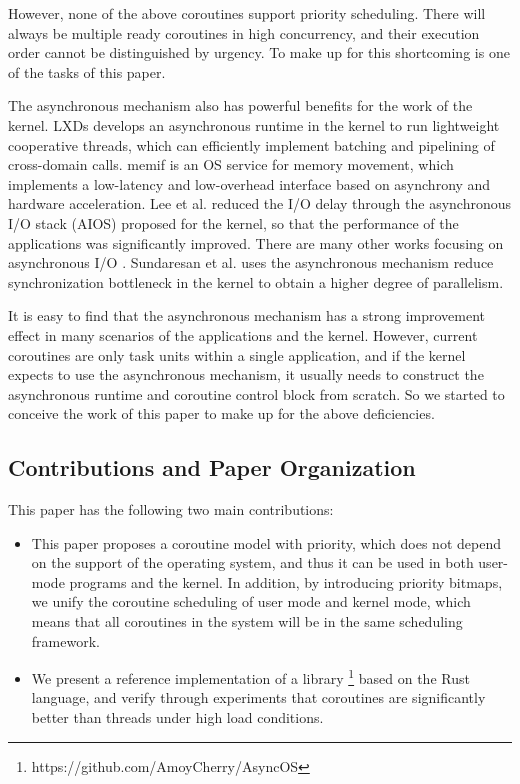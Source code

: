 \documentclass[conference]{IEEEtran}
\begin{document}
However, none of the above coroutines support priority scheduling. There will always be multiple ready coroutines in high concurrency, and their execution order cannot be distinguished by urgency. To make up for this shortcoming is one of the tasks of this paper.

The asynchronous mechanism also has powerful benefits for the work of the kernel. LXDs \cite{narayanan2019lxds} develops an asynchronous runtime in the kernel to run lightweight cooperative threads, which can efficiently implement batching and pipelining of cross-domain calls. memif \cite{lin2016memif} is an OS service for memory movement, which implements a low-latency and low-overhead interface based on asynchrony and hardware acceleration. Lee et al. \cite{lee2019asynchronous} reduced the I/O delay through the asynchronous I/O stack (AIOS) proposed for the kernel, so that the performance of the applications was significantly improved. There are many other works focusing on asynchronous I/O \cite{liao2020write, li2021pm, magoutis2002design, xu2016detecting}. Sundaresan et al. \cite{venkatasubramanian2009tuned} uses the asynchronous mechanism reduce synchronization bottleneck in the kernel to obtain a higher degree of parallelism.

It is easy to find that the asynchronous mechanism has a strong improvement effect in many scenarios of the applications and the kernel. However, current coroutines are only task units within a single application, and if the kernel expects to use the asynchronous mechanism, it usually needs to construct the asynchronous runtime and coroutine control block from scratch. So we started to conceive the work of this paper to make up for the above deficiencies.

\subsection{Contributions and Paper Organization}

This paper has the following two main contributions:

\begin{itemize}
\item This paper proposes a coroutine model with priority, which does not depend on the support of the operating system, and thus it can be used in both user-mode programs and the kernel. In addition, by introducing priority bitmaps, we unify the coroutine scheduling of user mode and kernel mode, which means that all coroutines in the system will be in the same scheduling framework.

\item We present a reference implementation of a library \footnote{https://github.com/AmoyCherry/AsyncOS} based on the Rust language, and verify through experiments that coroutines are significantly better than threads under high load conditions.
\end{itemize}
\end{document}
